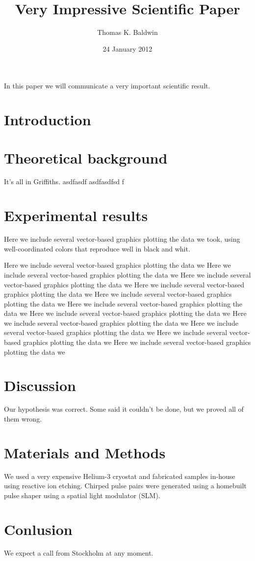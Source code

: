 \documentclass[11pt]{amsart}
\title{Very Impressive Scientific Paper}
\author{Thomas K. Baldwin}
\date{24 January 2012}
\begin{document}
\maketitle

In this paper we will communicate a very important scientific result.

\section{Introduction}

\section{Theoretical background}

It's all in Griffiths.
asdfasdf asdfasdfsd f
\section{Experimental results}

Here we include several vector-based graphics plotting the data we
took, using well-coordinated colors that reproduce well in black and
whit.

Here we include several vector-based graphics plotting the data we
Here we include several vector-based graphics plotting the data we
Here we include several vector-based graphics plotting the data we
Here we include several vector-based graphics plotting the data we
Here we include several vector-based graphics plotting the data we
Here we include several vector-based graphics plotting the data we
Here we include several vector-based graphics plotting the data we
Here we include several vector-based graphics plotting the data we
Here we include several vector-based graphics plotting the data we
Here we include several vector-based graphics plotting the data we
Here we include several vector-based graphics plotting the data we


\section{Discussion}

Our hypothesis was correct. Some said it couldn't be done, but we
proved all of them wrong.

\section{Materials and Methods}

We used a very expensive Helium-3 cryostat and fabricated samples
in-house using reactive ion etching. Chirped pulse pairs were
generated using a homebuilt pulse shaper using a spatial light
modulator (SLM).

\section{Conlusion}

We expect a call from Stockholm at any moment.
\end{document}
